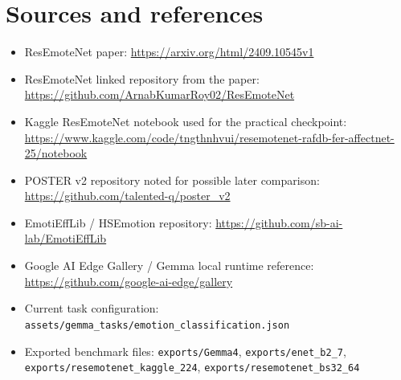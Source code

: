 \documentclass[11pt,a4paper]{article}
\begin{document}
\section*{Sources and references}
\begin{itemize}[leftmargin=*]
  \item ResEmoteNet paper: \url{https://arxiv.org/html/2409.10545v1}
  \item ResEmoteNet linked repository from the paper: \url{https://github.com/ArnabKumarRoy02/ResEmoteNet}
  \item Kaggle ResEmoteNet notebook used for the practical checkpoint: \url{https://www.kaggle.com/code/tngthnhvui/resemotenet-rafdb-fer-affectnet-25/notebook}
  \item POSTER v2 repository noted for possible later comparison: \url{https://github.com/talented-q/poster_v2}
  \item EmotiEffLib / HSEmotion repository: \url{https://github.com/sb-ai-lab/EmotiEffLib}
  \item Google AI Edge Gallery / Gemma local runtime reference: \url{https://github.com/google-ai-edge/gallery}
  \item Current task configuration: \texttt{assets/gemma\_tasks/emotion\_classification.json}
  \item Exported benchmark files: \texttt{exports/Gemma4}, \texttt{exports/enet\_b2\_7}, \texttt{exports/resemotenet\_kaggle\_224}, \texttt{exports/resemotenet\_bs32\_64}
\end{itemize}
\end{document}
